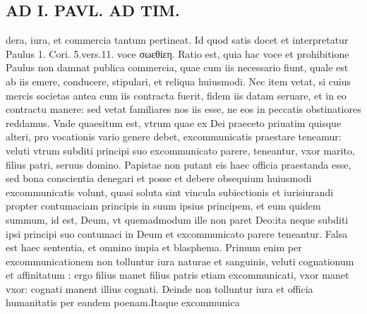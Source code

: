 \documentclass{article}
\begin{document}
\begin{pages}
\section*{AD I. PAVL. AD TIM. }
\marginpar{[ p.400 ]}\pstart dera, iura, et commercia tantum pertineat. Id quod satis docet et interpretatur Paulus 1. Cori. 5.vers.11. voce σωεθίεη. Ratio est, quia hac voce et prohibitione Paulus non damnat publica commercia, quae cum iis necessario fiunt, quale est ab iis emere, conducere, stipulari, et reliqua huiusmodi. Nec item vetat, si cuius mercis societas antea cum iis contracta fuerit, fidem iis datam seruare, et in eo contractu manere: sed vetat familiares nos iis esse, ne eos in peccatis obstinatiores reddamus. Vnde quaesitum est, vtrum quae ex Dei praeceto priuatim quisque alteri, pro vocationis vario genere debet, excommunicatis praestare teneamur: veluti vtrum subditi principi suo excommunicato parere, teneantur, vxor marito, filius patri, seruus domino. Papistae non putant eis haec officia praestanda esse, sed bona conscientia denegari et posse et debere obsequium huiusmodi excommunicatis volunt, quasi soluta sint vincula subiectionis et iurisiurandi propter contumaciam principis in suum ipsius principem, et eum quidem summum, id est, Deum, vt quemadmodum ille non paret Deo:ita neque subditi ipsi principi suo contumaci in Deum et excommunicato parere teneantur. Falsa est haec sententia, et omnino impia et blasphema. Primum enim per excommunicationem non tolluntur iura naturae et sanguinis, veluti cognationum et affinitatum : ergo filius manet filius patris etiam excommunicati, vxor manet vxor: cognati manent illius cognati. Deinde non tolluntur iura et officia humanitatis per eandem poenam.Itaque excommunica\pend

\end{pages}
\end{document}
